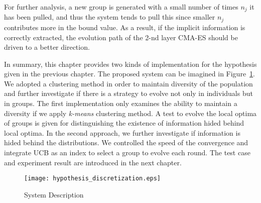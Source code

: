 For further analysis, a new group is generated with a small number of
times $n_j$ it has been pulled, and thus the system tends to pull this
since smaller $n_j$ contributes more in the bound value.
As a result, if the implicit information is correctly extracted, the
evolution path of the 2-nd layer CMA-ES should be driven to a better
direction.  

In summary, this chapter provides two kinds of implementation for
the hypothesis given in the previous chapter.
The proposed system can be imagined in Figure~\ref{fig:system}.
We adopted a clustering method in order to maintain diversity of the
population and further investigate if there is a strategy to evolve not
only in individuals but in groups.
The first implementation only examines the ability to maintain a
diversity if we apply \emph{k-means} clustering method.
A test to evolve the local optima of groups is given for distinguishing
the existence of information hided behind local optima.
In the second approach, we further investigate if information is
hided behind the distributions.
We controlled the speed of the convergence and integrate UCB as an index
to select a group to evolve each round.
The test case and experiment result are introduced in the next chapter.


\begin{figure}[htpb]
  \centering
  \texttt{[image: hypothesis\_discretization.eps]}
  \caption{System Description}
  \label{fig:system}
\end{figure}
